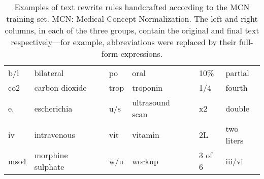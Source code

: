 \begingroup
\setlength{}

\begin{table}[!tb]

\caption[Examples of text rewrite rules handcrafted according to the MCN training set.]{Examples of text rewrite rules handcrafted according to the MCN training set. MCN: Medical Concept Normalization. The left and right columns, in each of the three groups, contain the original and  final text respectively---for example, abbreviations were replaced by their full-form expressions.}
\label{tab:mcn-preprocessing}

\centering

\begin{tabular}{D{9mm}D{32.5mm}m{0mm}D{7.5mm}D{27.5mm}m{0mm}D{9.5mm}D{16.5mm}}


b/l  & bilateral         & & po   & oral            & & 10\%   & partial\\
co2  & carbon dioxide    & & trop & troponin        & & 1/4    & fourth\\
e.   & escherichia       & & u/s  & ultrasound scan & & x2     & double\\
iv   & intravenous       & & vit  & vitamin         & & 2L     & two liters\\
mso4 & morphine sulphate & & w/u  & workup          & & 3 of 6 & iii/vi\\


\end{tabular}
\end{table}
\endgroup
